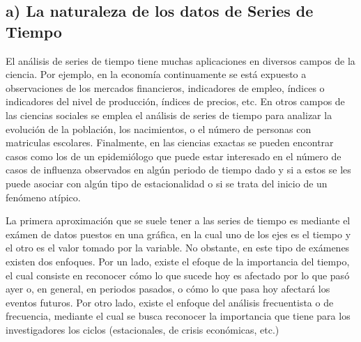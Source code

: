 \documentclass[
  a4paper,
]{article}
\begin{document}
\subsection{a) La naturaleza de los datos de Series de
Tiempo}\label{a-la-naturaleza-de-los-datos-de-series-de-tiempo}

El análisis de series de tiempo tiene muchas aplicaciones en diversos
campos de la ciencia. Por ejemplo, en la economía continuamente se está
expuesto a observaciones de los mercados financieros, indicadores de
empleo, índices o indicadores del nivel de producción, índices de
precios, etc. En otros campos de las ciencias sociales se emplea el
análisis de series de tiempo para analizar la evolución de la población,
los nacimientos, o el número de personas con matriculas escolares.
Finalmente, en las ciencias exactas se pueden encontrar casos como los
de un epidemiólogo que puede estar interesado en el número de casos de
influenza observados en algún periodo de tiempo dado y si a estos se les
puede asociar con algún tipo de estacionalidad o si se trata del inicio
de un fenómeno atípico.

La primera aproximación que se suele tener a las series de tiempo es
mediante el exámen de datos puestos en una gráfica, en la cual uno de
los ejes es el tiempo y el otro es el valor tomado por la variable. No
obstante, en este tipo de exámenes existen dos enfoques. Por un lado,
existe el efoque de la importancia del tiempo, el cual consiste en
reconocer cómo lo que sucede hoy es afectado por lo que pasó ayer o, en
general, en periodos pasados, o cómo lo que pasa hoy afectará los
eventos futuros. Por otro lado, existe el enfoque del análisis
frecuentista o de frecuencia, mediante el cual se busca reconocer la
importancia que tiene para los investigadores los ciclos (estacionales,
de crisis económicas, etc.)
\end{document}
